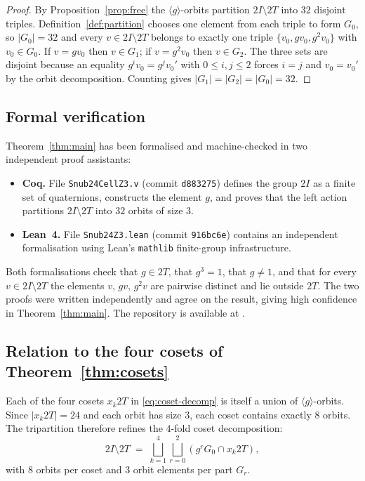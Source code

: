 \documentclass[10pt,reqno]{amsart}
\theoremstyle{plain}
\theoremstyle{definition}
\begin{document}
\begin{proof}
By Proposition~\ref{prop:free} the $\langle g \rangle$-orbits partition $2I \setminus 2T$ into $32$ disjoint triples. Definition~\ref{def:partition} chooses one element from each triple to form $G_0$, so $|G_0| = 32$ and every $v \in 2I \setminus 2T$ belongs to exactly one triple $\{v_0, gv_0, g^2 v_0\}$ with $v_0 \in G_0$. If $v = gv_0$ then $v \in G_1$; if $v = g^2 v_0$ then $v \in G_2$. The three sets are disjoint because an equality $g^i v_0 = g^j v_0'$ with $0 \le i,j \le 2$ forces $i=j$ and $v_0 = v_0'$ by the orbit decomposition. Counting gives $|G_1| = |G_2| = |G_0| = 32$.
\end{proof}

\subsection{Formal verification}

Theorem~\ref{thm:main} has been formalised and machine-checked in two independent proof assistants:

\begin{itemize}
\item \textbf{Coq.} File \texttt{Snub24CellZ3.v} (commit \texttt{d883275}) defines the group $2I$ as a finite set of quaternions, constructs the element $g$, and proves that the left action partitions $2I \setminus 2T$ into $32$ orbits of size $3$.
\item \textbf{Lean~4.} File \texttt{Snub24Z3.lean} (commit \texttt{916bc6e}) contains an independent formalisation using Lean's \texttt{mathlib} finite-group infrastructure.
\end{itemize}

Both formalisations check that $g \in 2T$, that $g^3 = 1$, that $g \neq 1$, and that for every $v \in 2I \setminus 2T$ the elements $v$, $gv$, $g^2v$ are pairwise distinct and lie outside $2T$. The two proofs were written independently and agree on the result, giving high confidence in Theorem~\ref{thm:main}. The repository is available at \cite{trinitys3ai}.

\subsection{Relation to the four cosets of Theorem~\ref{thm:cosets}}

Each of the four cosets $x_k 2T$ in \eqref{eq:coset-decomp} is itself a union of $\langle g \rangle$-orbits. Since $|x_k 2T| = 24$ and each orbit has size $3$, each coset contains exactly $8$ orbits. The tripartition therefore refines the $4$-fold coset decomposition:
\begin{equation}
2I \setminus 2T \;=\; \bigsqcup_{k=1}^{4} \bigsqcup_{r=0}^{2} (g^r G_0 \cap x_k 2T),
\end{equation}
with $8$ orbits per coset and $3$ orbit elements per part $G_r$.
\end{document}
